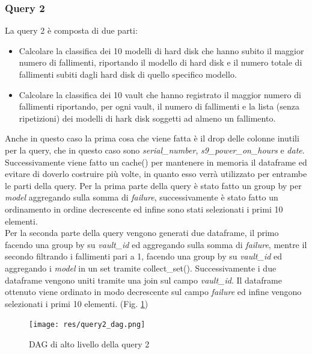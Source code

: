 \documentclass[conference]{IEEEtran}
\begin{document}
\subsubsection{Query 2}
La query 2 è composta di due parti:
\begin{itemize}
    \item Calcolare la classifica dei 10 modelli di hard disk che hanno subito il maggior numero di fallimenti, riportando il modello di hard disk e il numero totale di fallimenti subiti dagli hard disk di quello specifico modello.
    \item Calcolare la classifica dei 10 vault che hanno registrato il maggior numero di
    fallimenti riportando, per ogni vault, il numero di fallimenti e la lista (senza ripetizioni) dei modelli di
    hark disk soggetti ad almeno un fallimento.
\end{itemize}
Anche in questo caso la prima cosa che viene fatta è il drop delle colonne inutili per la query, che in questo caso sono \textit{serial\_number}, \textit{s9\_power\_on\_hours} e \textit{date}. Successivamente viene fatto un cache() per mantenere in memoria il dataframe ed evitare di doverlo costruire più volte, in quanto esso verrà utilizzato per entrambe le parti della query.
Per la prima parte della query è stato fatto un group by per \textit{model} aggregando sulla somma di \textit{failure}, successivamente è stato fatto un ordinamento in ordine decrescente ed infine sono stati selezionati i primi 10 elementi.\\
Per la seconda parte della query vengono generati due dataframe, il primo facendo una group by su \textit{vault\_id} ed aggregando sulla somma di \textit{failure}, mentre il secondo filtrando i fallimenti pari a 1, facendo una group by su \textit{vault\_id} ed aggregando i \textit{model} in un set tramite collect\_set(). Successivamente i due dataframe vengono uniti tramite una join sul campo \textit{vault\_id}. Il dataframe ottenuto viene ordinato in modo decrescente sul campo \textit{failure} ed infine vengono selezionati i primi 10 elementi. (Fig. \ref{fig:dag_query2})
\begin{figure}[H]
    \centerline{\texttt{[image: res/query2\_dag.png]}}
    \caption{DAG di alto livello della query 2}
    \label{fig:dag_query2}
\end{figure}
\end{document}

